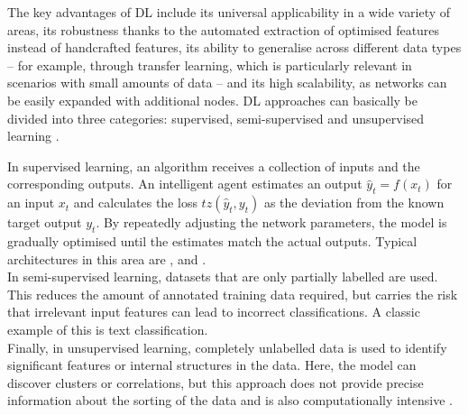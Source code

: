 The key advantages of \acrshort{DL} include its universal applicability in a wide variety of areas, its robustness thanks to the automated extraction of optimised features instead of handcrafted features, its ability to generalise across different data types – for example, through transfer learning, which is particularly relevant in scenarios with small amounts of data – and its high scalability, as networks can be easily expanded with additional nodes. DL approaches can basically be divided into three categories: supervised, semi-supervised and unsupervised learning \cite{Alzubaidi2021}.
  

In supervised learning, an algorithm receives a collection of inputs and the corresponding outputs. An intelligent agent estimates an output $\hat{y}_t = f(x_t)$ for an input $x_t$ and calculates the loss $tz(\hat{y}_t, y_t)$ as the deviation from the known target output $y_t$. By repeatedly adjusting the network parameters, the model is gradually optimised until the estimates match the actual outputs. Typical architectures in this area are ,  and . \\ In semi-supervised learning, datasets that are only partially labelled are used. This reduces the amount of annotated training data required, but carries the risk that irrelevant input features can lead to incorrect classifications. A classic example of this is text classification. \\ Finally, in unsupervised learning, completely unlabelled data is used to identify significant features or internal structures in the data. Here, the model can discover clusters or correlations, but this approach does not provide precise information about the sorting of the data and is also computationally intensive \cite{Alzubaidi2021}.
  

